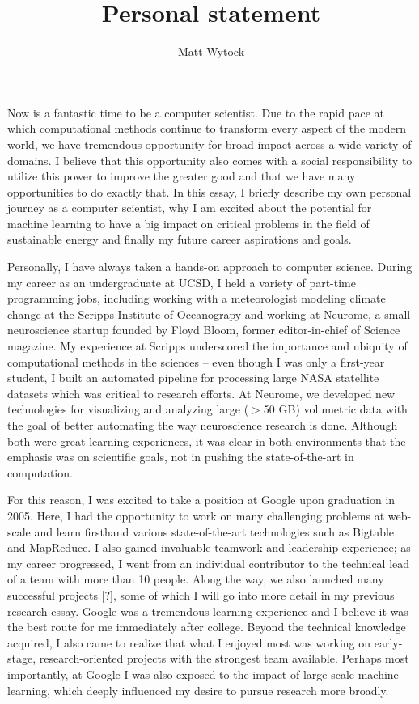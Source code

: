 \documentclass[12pt]{article}
\title{Personal statement}
\author{Matt Wytock}
\begin{document}
Now is a fantastic time to be a computer scientist. Due to the rapid pace at which computational methods continue to transform every aspect of the modern world, we have tremendous opportunity for broad impact across a wide variety of domains. I believe that this opportunity also comes with a social responsibility to utilize this power to improve the greater good and that we have many opportunities to do exactly that. In this essay, I briefly describe my own personal journey as a computer scientist, why I am excited about the potential for machine learning to have a big impact on critical problems in the field of sustainable energy and finally my future career aspirations and goals.

Personally, I have always taken a hands-on approach to computer science. During my career as an undergraduate at UCSD, I held a variety of part-time programming jobs, including working with a meteorologist modeling climate change at the Scripps Institute of Oceanograpy and working at Neurome, a small neuroscience startup founded by Floyd Bloom, former editor-in-chief of Science magazine. My experience at Scripps underscored the importance and ubiquity of computational methods in the sciences -- even though I was only a first-year student, I built an automated pipeline for processing large NASA statellite datasets which was critical to research efforts. At Neurome, we developed new technologies for visualizing and analyzing large ($>$50 GB) volumetric data with the goal of better automating the way neuroscience research is done. Although both were great learning experiences, it was clear in both environments that the emphasis was on scientific goals, not in pushing the state-of-the-art in computation.

For this reason, I was excited to take a position at Google upon graduation in 2005. Here, I had the opportunity to work on many challenging problems at web-scale and learn firsthand various state-of-the-art technologies such as Bigtable and MapReduce. I also gained invaluable teamwork and leadership experience; as my career progressed, I went from an individual contributor to the technical lead of a team with more than 10 people. Along the way, we also launched many successful projects [?], some of which I will go into more detail in my previous research essay. Google was a tremendous learning experience and I believe it was the best route for me immediately after college. Beyond the technical knowledge acquired, I also came to realize that what I enjoyed most was working on early-stage, research-oriented projects with the strongest team available. Perhaps most importantly, at Google I was also exposed to the impact of large-scale machine learning, which deeply influenced my desire to pursue research more broadly. 
\end{document}
